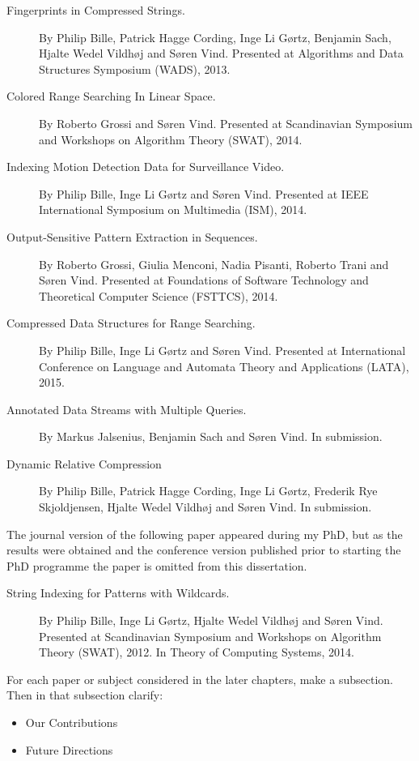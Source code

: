 \begin{description}
    \item[Fingerprints in Compressed Strings.] By Philip Bille, Patrick Hagge Cording, Inge Li Gørtz, Benjamin Sach, Hjalte Wedel Vildhøj and Søren Vind. Presented at Algorithms and Data Structures Symposium (WADS), 2013.
    \item[Colored Range Searching In Linear Space.] By Roberto Grossi and Søren Vind. Presented at Scandinavian Symposium and Workshops on Algorithm Theory (SWAT), 2014.
    \item[Indexing Motion Detection Data for Surveillance Video.] By Philip Bille, Inge Li Gørtz and Søren Vind. Presented at IEEE International Symposium on Multimedia (ISM), 2014.
    \item[Output-Sensitive Pattern Extraction in Sequences.] By Roberto Grossi, Giulia Menconi, Nadia Pisanti, Roberto Trani and Søren Vind. Presented at Foundations of Software Technology and Theoretical Computer Science (FSTTCS), 2014.
    \item[Compressed Data Structures for Range Searching.] By Philip Bille, Inge Li Gørtz and Søren Vind. Presented at International Conference on Language and Automata Theory and Applications (LATA), 2015.
    \item[Annotated Data Streams with Multiple Queries.] By Markus Jalsenius, Benjamin Sach and Søren Vind. In submission.
    \item[Dynamic Relative Compression] By Philip Bille, Patrick Hagge Cording, Inge Li Gørtz, Frederik Rye Skjoldjensen, Hjalte Wedel Vildhøj and Søren Vind. In submission.
\end{description}

The journal version of the following paper appeared during my PhD, but as the results were obtained and the conference version published prior to starting the PhD programme the paper is omitted from this dissertation.

\begin{description}
    \item[String Indexing for Patterns with Wildcards.] By Philip Bille, Inge Li Gørtz, Hjalte Wedel Vildhøj and Søren Vind. Presented at Scandinavian Symposium and Workshops on Algorithm Theory (SWAT), 2012. In Theory of Computing Systems, 2014. 
\end{description}



For each paper or subject considered in the later chapters, make a subsection. 
Then in that subsection clarify:
\begin{itemize}
    \item Our Contributions
    \item Future Directions
\end{itemize}

